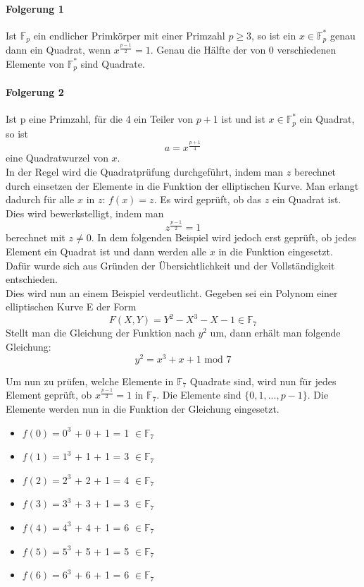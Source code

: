 \paragraph{Folgerung 1}
Ist $\mathbb{F}_p$ ein endlicher Primkörper mit einer Primzahl $p \geq 3$, so ist ein $x \in \mathbb{F}_p^*$ genau dann ein Quadrat, wenn $x^{\frac{p - 1}{2}} = 1$. Genau die Hälfte der von 0 verschiedenen Elemente von $\mathbb{F}_p^*$ sind Quadrate.

\paragraph{Folgerung 2}
Ist p eine Primzahl, für die 4 ein Teiler von $p + 1$ ist und ist $x \in \mathbb{F}_p^*$ ein Quadrat, so ist $$a = x^{\frac{p + 1}{4}}$$ eine Quadratwurzel von $x$.\\

In der Regel wird die Quadratprüfung durchgeführt, indem man $z$ berechnet durch einsetzen der Elemente in die Funktion der elliptischen Kurve. Man erlangt dadurch für alle $x$ in $z$: $f(x) = z$. Es wird geprüft, ob das $z$ ein Quadrat ist. Dies wird bewerkstelligt, indem man $$z^{\frac {p-1}{2}} = 1$$ berechnet mit $z \neq 0$. In dem folgenden Beispiel wird jedoch erst geprüft, ob jedes Element ein Quadrat ist und dann werden alle $x$ in die Funktion eingesetzt. Dafür wurde sich aus Gründen der Übersichtlichkeit und der Vollständigkeit entschieden.\\

Dies wird nun an einem Beispiel verdeutlicht. Gegeben sei ein Polynom einer elliptischen Kurve E der Form $$F(X, Y) = Y^{2} - X^{3} - X - 1 \in \mathbb{F}_{7}$$ Stellt man die Gleichung der Funktion nach $y^{2}$ um, dann erhält man folgende Gleichung: $$y^{2} =  x^{3} + x + 1 \text{ mod }7$$

Um nun zu prüfen, welche Elemente in $\mathbb{F}_{7}$ Quadrate sind, wird nun für jedes Element geprüft, ob $x^{\frac{p - 1}{2}} = 1$ in $\mathbb{F}_{7}$. Die Elemente sind $\{0, 1, ..., p - 1\}$. Die Elemente werden nun in die Funktion der Gleichung eingesetzt.

\begin{itemize}
\item $f(0) =  0^{3}$ + 0 + 1 = 1 $\in \mathbb{F}_{7}$
\item $f(1) =  1^{3}$ + 1 + 1 = 3 $\in \mathbb{F}_{7}$
\item $f(2) =  2^{3}$ + 2 + 1 = 4 $\in \mathbb{F}_{7}$
\item $f(3) =  3^{3}$ + 3 + 1 = 3 $\in \mathbb{F}_{7}$
\item $f(4) =  4^{3}$ + 4 + 1 = 6 $\in \mathbb{F}_{7}$
\item $f(5) =  5^{3}$ + 5 + 1 = 5 $\in \mathbb{F}_{7}$
\item $f(6) =  6^{3}$ + 6 + 1 = 6 $\in \mathbb{F}_{7}$
\end{itemize}

